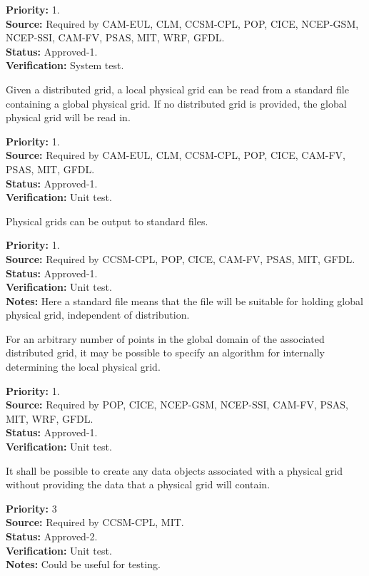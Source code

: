 \begin{reqlist}
{\bf Priority:} 1. \\
{\bf Source:} Required by CAM-EUL, CLM, CCSM-CPL, POP, CICE, NCEP-GSM, NCEP-SSI,
     CAM-FV, PSAS, MIT, WRF, GFDL. \\
{\bf Status:} Approved-1. \\
{\bf Verification:} System test.
\end{reqlist}

Given a distributed grid, a local physical grid can be read from a standard file containing a
global physical grid. If no distributed grid is provided, the global physical grid will
be read in.
\begin{reqlist}
{\bf Priority:} 1. \\
{\bf Source:} Required by CAM-EUL, CLM, CCSM-CPL, POP, CICE, 
              CAM-FV, PSAS, MIT, GFDL. \\
{\bf Status:} Approved-1. \\
{\bf Verification:} Unit test.
\end{reqlist}

Physical grids can be output to standard files.
\begin{reqlist}
{\bf Priority:} 1. \\
{\bf Source:} Required by CCSM-CPL, POP, CICE, 
              CAM-FV, PSAS, MIT, GFDL. \\
{\bf Status:} Approved-1. \\
{\bf Verification:} Unit test.\\
{\bf Notes:}  Here a standard file means that the file will
be suitable for holding global physical grid, independent of distribution.
\end{reqlist}

For an arbitrary number of points in the global domain of the associated
distributed grid, it may be possible to specify an algorithm for internally
determining the local physical grid.
\begin{reqlist}
{\bf Priority:} 1. \\
{\bf Source:} Required by POP, CICE, NCEP-GSM, NCEP-SSI,
              CAM-FV, PSAS, MIT, WRF, GFDL. \\
{\bf Status:} Approved-1. \\
{\bf Verification:} Unit test.
\end{reqlist}

It shall be possible to create any data objects associated with a physical grid without
providing the data that a physical grid will contain.
\begin{reqlist}
{\bf Priority:} 3\\
{\bf Source:} Required by CCSM-CPL, MIT. \\
{\bf Status:} Approved-2. \\
{\bf Verification:} Unit test. \\
{\bf Notes:} Could be useful for testing.
\end{reqlist}

